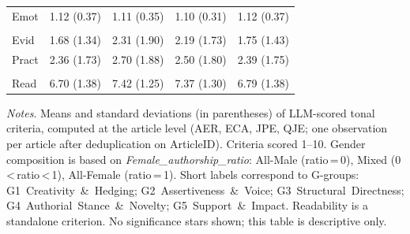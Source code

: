 \begin{table}[H]
\begin{threeparttable}
\begin{tabular}{p{3.5cm}cccc}
            \quad Emot & 1.12 (0.37) & 1.11 (0.35) & 1.10 (0.31) & 1.12 (0.37) \\
            \addlinespace[4pt]
            \multicolumn{5}{l}{\textit{G5: Support \& Impact}} \\
            \quad Evid & 1.68 (1.34) & 2.31 (1.90) & 2.19 (1.73) & 1.75 (1.43) \\
            \quad Pract & 2.36 (1.73) & 2.70 (1.88) & 2.50 (1.80) & 2.39 (1.75) \\
            \addlinespace[4pt]
            \multicolumn{5}{l}{\textit{Standalone}} \\
            \quad Read & 6.70 (1.38) & 7.42 (1.25) & 7.37 (1.30) & 6.79 (1.38) \\
            \bottomrule
        \end{tabular}
        \begin{tablenotes}
            \footnotesize
            \item \textit{Notes}. Means and standard deviations (in parentheses) of LLM-scored tonal criteria, computed at the article level (AER, ECA, JPE, QJE; one observation per article after deduplication on ArticleID). Criteria scored 1--10. Gender composition is based on \textit{Female\_authorship\_ratio}: All-Male (ratio\,=\,0), Mixed (0\,<\,ratio\,<\,1), All-Female (ratio\,=\,1). Short labels correspond to G-groups: G1~Creativity~\&~Hedging; G2~Assertiveness~\&~Voice; G3~Structural~Directness; G4~Authorial~Stance~\&~Novelty; G5~Support~\&~Impact. Readability is a standalone criterion. No significance stars shown; this table is descriptive only.
        \end{tablenotes}
    \end{threeparttable}
\end{table}
